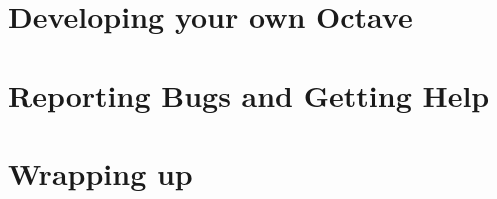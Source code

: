\documentclass[xcolor=svgnames,aspectratio=169]{beamer}
\begin{document}
\section{Developing your own Octave}
\frame{\tableofcontents[currentsection]}



\section{Reporting Bugs and Getting Help}
\frame{\tableofcontents[currentsection]}



\section{Wrapping up}
\frame{\tableofcontents[currentsection]}

\end{document}
